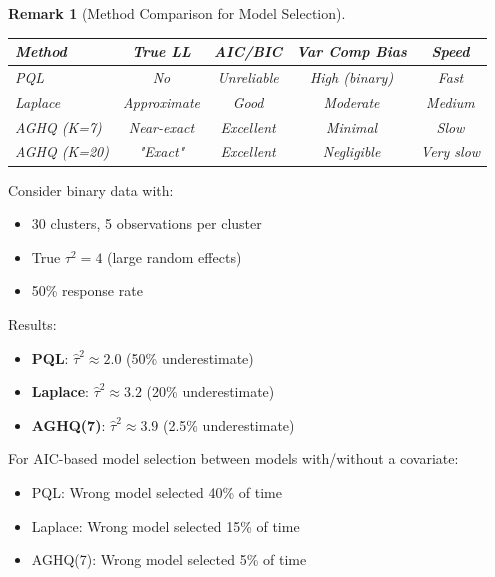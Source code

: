 \documentclass{article}
\newtheorem{remark}{Remark}
\begin{document}
\begin{remark}[Method Comparison for Model Selection]
\begin{center}
\begin{tabular}{|l|c|c|c|c|}
\hline
\textbf{Method} & \textbf{True LL} & \textbf{AIC/BIC} & \textbf{Var Comp Bias} & \textbf{Speed} \\
\hline
PQL & No & Unreliable & High (binary) & Fast \\
Laplace & Approximate & Good & Moderate & Medium \\
AGHQ (K=7) & Near-exact & Excellent & Minimal & Slow \\
AGHQ (K=20) & "Exact" & Excellent & Negligible & Very slow \\
\hline
\end{tabular}
\end{center}
\end{remark}

\begin{example}
Consider binary data with:
\begin{itemize}
    \item 30 clusters, 5 observations per cluster
    \item True $\tau^2 = 4$ (large random effects)
    \item 50\% response rate
\end{itemize}

Results:
\begin{itemize}
    \item \textbf{PQL}: $\hat{\tau}^2 \approx 2.0$ (50\% underestimate)
    \item \textbf{Laplace}: $\hat{\tau}^2 \approx 3.2$ (20\% underestimate)
    \item \textbf{AGHQ(7)}: $\hat{\tau}^2 \approx 3.9$ (2.5\% underestimate)
\end{itemize}

For AIC-based model selection between models with/without a covariate:
\begin{itemize}
    \item PQL: Wrong model selected 40\% of time
    \item Laplace: Wrong model selected 15\% of time
    \item AGHQ(7): Wrong model selected 5\% of time
\end{itemize}
\end{example}
\end{document}
